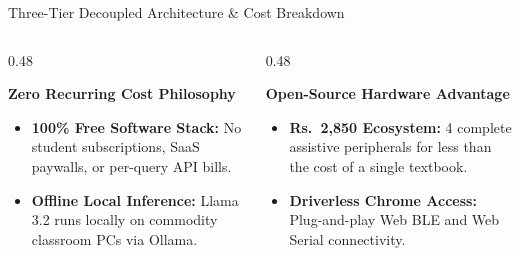 \documentclass[aspectratio=169,10pt]{beamer}
\begin{document}
\begin{frame}{Three-Tier Decoupled Architecture \& Cost Breakdown}
\begin{center}
    \end{center}
    
    \vspace{0.15cm}
    \begin{columns}[T]
        \begin{column}{0.48\textwidth}
            \begin{block}{\textbf{Zero Recurring Cost Philosophy}}
                \begin{itemize}
                    \item \textbf{100\% Free Software Stack:} No student subscriptions, SaaS paywalls, or per-query API bills.
                    \item \textbf{Offline Local Inference:} Llama 3.2 runs locally on commodity classroom PCs via Ollama.
                \end{itemize}
            \end{block}
        \end{column}
        \begin{column}{0.48\textwidth}
            \begin{block}{\textbf{Open-Source Hardware Advantage}}
                \begin{itemize}
                    \item \textbf{Rs.~2,850 Ecosystem:} 4 complete assistive peripherals for less than the cost of a single textbook.
                    \item \textbf{Driverless Chrome Access:} Plug-and-play Web BLE and Web Serial connectivity.
                \end{itemize}
            \end{block}
        \end{column}
    \end{columns}
\end{frame}
\end{document}
